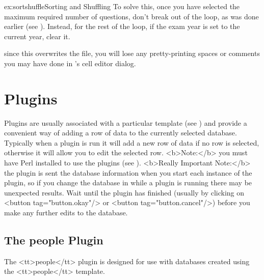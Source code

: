 \begin{example}{ex:sortshuffle}{Sorting and Shuffling}
To solve this, once you have selected the maximum required number of
questions, don't break out of the loop, as was done earlier (see
). Instead, for the rest of the loop, if the exam
year is set to the current year, clear it.


 since this overwrites the  file, you will
lose any pretty-printing spaces or comments you may have done in 
's cell editor dialog.

\end{example}


\section{Plugins}\label{sec:plugins}

   Plugins are usually associated with a particular template 
   (see ) and provide a convenient way of
   adding a row of data to the currently selected database.
   Typically when a plugin is run it will add a new row of data 
   if no row is selected, otherwise it will allow you to edit the selected row.
   <b>Note:</b> you must have Perl installed to use the plugins (see 
   ). <b>Really Important Note:</b> the plugin is
   sent the database information when you start each instance of the plugin, 
   so if you change the database in  while a plugin is running 
   there may be unexpected results. Wait until the plugin has finished 
   (usually by clicking on <button tag="button.okay"/> or 
   <button tag="button.cancel"/>) before you make any further edits to the 
   database.


\subsection{The people Plugin}\label{sec:peopleplugin}

   The <tt>people</tt> plugin is designed for use with databases created
   using the <tt>people</tt> template.

